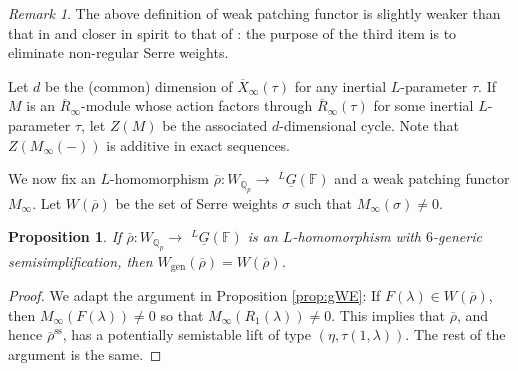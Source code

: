 \documentclass[oneside,a4paper,english, 11pt]{amsart}
\theoremstyle{plain}
\theoremstyle{plain}
\newtheorem{prop}[thm]{Proposition}
\theoremstyle{plain}
\theoremstyle{plain}
\theoremstyle{plain}
\theoremstyle{plain}
\theoremstyle{definition}
\theoremstyle{definition}
\theoremstyle{definition}
\theoremstyle{remark}
\newtheorem{rmk}[thm]{Remark}
\numberwithin{equation}{section}
\newcommand{\Q}{\mathbb{Q}}
\newcommand{\F}{\mathbb{F}}
\newcommand{\un}[1]{\underline{#1}}
\newcommand{\rhobar}{\overline{\rho}}
\newcommand{\ovl}[1]{\overline{#1}}
\newcommand{\ra}{\rightarrow}
\begin{document}
\begin{rmk}
The above definition of weak patching functor is slightly weaker than that in \cite[Definition 6.2.1]{MLM} and closer in spirit to that of \cite[Definition 4.2.1]{LLL}: the purpose of the third item is to eliminate non-regular Serre weights.
\end{rmk}


Let $d$ be the (common) dimension of $\ovl{X}_\infty(\tau)$ for any inertial $L$-parameter $\tau$. 
If $M$ is an $\ovl{R}_\infty$-module whose action factors through $\ovl{R}_\infty(\tau)$ for some inertial $L$-parameter $\tau$, let $Z(M)$ be the associated $d$-dimensional cycle. 
Note that $Z(M_\infty(-))$ is additive in exact sequences. 

We now fix an $L$-homomorphism $\rhobar: W_{\Q_p} \ra$ $^L \un{G}(\F)$ and a weak patching functor $M_\infty$. 
Let $W(\rhobar)$ be the set of Serre weights $\sigma$ such that $M_\infty(\sigma) \neq 0$.

%
\begin{prop}
\label{prop:gen:8}
If $\rhobar: W_{\Q_p} \ra$ $^L \un{G}(\F)$ is an $L$-homomorphism with $6$-generic semisimplification, then $W_{\mathrm{gen}}(\rhobar)=W(\rhobar)$.
\end{prop}
\begin{proof} We adapt the argument in Proposition \ref{prop:gWE}: If $F(\lambda) \in W(\rhobar)$, then $M_\infty(F(\lambda))\neq 0$ so that $M_{\infty}(R_1(\lambda))\neq 0$. 
This implies that $\rhobar$, and hence $\rhobar^{\mathrm{ss}}$, has a potentially semistable lift of type $(\eta,\tau(1,\lambda))$. 
The rest of the argument is the same. 
\end{proof}
\end{document}
